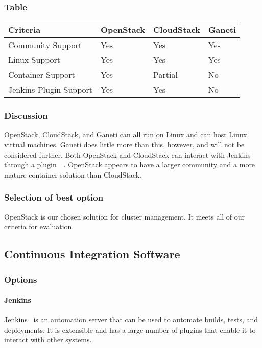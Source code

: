 \documentclass[10pt,letterpaper,onecolumn,draftclsnofoot]{IEEEtran}
\begin{document}
\subsubsection{Table}
\begin{center}
  \begin{tabular}{llll}
    Criteria & OpenStack & CloudStack & Ganeti \\ \midrule
    Community Support       & Yes & Yes & Yes \\ \midrule
    Linux Support           & Yes & Yes & Yes \\ \midrule
    Container Support       & Yes & Partial & No \\ \midrule
    Jenkins Plugin Support  & Yes & Yes & No \\ \bottomrule
  \end{tabular}
\end{center}
\subsubsection{Discussion}
OpenStack, CloudStack, and Ganeti can all run on Linux and can host Linux virtual machines.
Ganeti does little more than this, however, and will not be considered further.
Both OpenStack and CloudStack can interact with Jenkins through a plugin~\cite{jcloudsplugin}~\cite{jcloudsproviders}.
OpenStack appears to have a larger community and a more mature container solution than CloudStack.
\subsubsection{Selection of best option}
OpenStack is our chosen solution for cluster management. It meets all of our criteria for evaluation.

\subsection{Continuous Integration Software}
\subsubsection{Options}
\paragraph{Jenkins}
Jenkins~\cite{jenkinsmain} is an automation server that can be used to automate builds, tests, and deployments.
It is extensible and has a large number of plugins that enable it to interact with other systems. 
\end{document}
